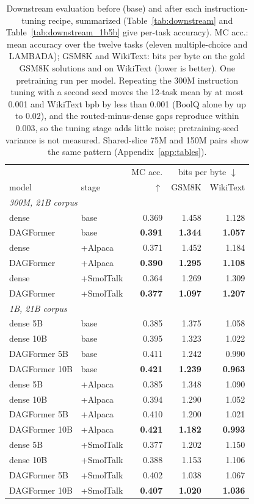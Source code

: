 \documentclass[11pt]{article}
\newcommand{\dagf}{DAGFormer}
\begin{document}
\begin{table}[t]
\centering\footnotesize
\setlength{\tabcolsep}{2pt}
\begin{tabular}{llrrr}
\toprule
 & & MC acc. & \multicolumn{2}{c}{bits per byte $\downarrow$} \\
model & stage & $\uparrow$ & GSM8K & WikiText \\
\midrule
\multicolumn{5}{l}{\emph{300M, 21B corpus}} \\
dense & base & 0.369 & 1.458 & 1.128 \\
\dagf{} & base & \textbf{0.391} & \textbf{1.344} & \textbf{1.057} \\
dense & +Alpaca & 0.371 & 1.452 & 1.184 \\
\dagf{} & +Alpaca & \textbf{0.390} & \textbf{1.295} & \textbf{1.108} \\
dense & +SmolTalk & 0.364 & 1.269 & 1.309 \\
\dagf{} & +SmolTalk & \textbf{0.377} & \textbf{1.097} & \textbf{1.207} \\
\midrule
\multicolumn{5}{l}{\emph{1B, 21B corpus}} \\
dense 5B & base & 0.385 & 1.375 & 1.058 \\
dense 10B & base & 0.395 & 1.323 & 1.022 \\
\dagf{} 5B & base & 0.411 & 1.242 & 0.990 \\
\dagf{} 10B & base & \textbf{0.421} & \textbf{1.239} & \textbf{0.963} \\
dense 5B & +Alpaca & 0.385 & 1.348 & 1.090 \\
dense 10B & +Alpaca & 0.394 & 1.290 & 1.052 \\
\dagf{} 5B & +Alpaca & 0.410 & 1.200 & 1.021 \\
\dagf{} 10B & +Alpaca & \textbf{0.421} & \textbf{1.182} & \textbf{0.993} \\
dense 5B & +SmolTalk & 0.377 & 1.202 & 1.150 \\
dense 10B & +SmolTalk & 0.388 & 1.153 & 1.106 \\
\dagf{} 5B & +SmolTalk & 0.402 & 1.038 & 1.067 \\
\dagf{} 10B & +SmolTalk & \textbf{0.407} & \textbf{1.020} & \textbf{1.036} \\
\bottomrule
\end{tabular}
\caption{Downstream evaluation before (base) and after each instruction-tuning recipe, summarized (Table~\ref{tab:downstream} and Table~\ref{tab:downstream_1b5b} give per-task accuracy). MC acc.: mean accuracy over the twelve tasks (eleven multiple-choice and LAMBADA); GSM8K and WikiText: bits per byte on the gold GSM8K solutions and on WikiText (lower is better). One pretraining run per model. Repeating the 300M instruction tuning with a second seed moves the 12-task mean by at most 0.001 and WikiText bpb by less than 0.001 (BoolQ alone by up to 0.02), and the routed-minus-dense gaps reproduce within 0.003, so the tuning stage adds little noise; pretraining-seed variance is not measured. Shared-slice 75M and 150M pairs show the same pattern (Appendix~\ref{app:tables}).}
\label{tab:downstream_full}
\end{table}
\end{document}
